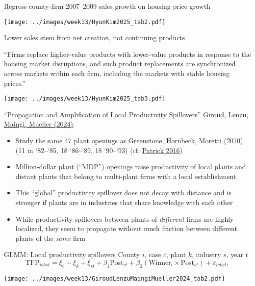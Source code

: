 \documentclass[11pt,notes=hide,aspectratio=169]{beamer}
\begin{document}
\begin{frame}{Regress county-firm 2007--2009 sales growth on housing price growth}
\begin{center}
\texttt{[image: ../images/week13/HyunKim2025\_tab2.pdf]}
\end{center}
\end{frame}
\begin{frame}{Lower sales stem from net creation, not continuing products}
{\scriptsize ``Firms replace higher-value products with lower-value products in response to the housing market disruptions, and such product replacements are synchronized across markets within each firm, including the markets with stable housing prices.''\par}
\begin{center}
\vspace{-2mm}
\texttt{[image: ../images/week13/HyunKim2025\_tab3.pdf]}
\end{center}
\end{frame}
\begin{frame}{``Propagation and Amplification of Local Productivity Spillovers''}
\href{https://doi.org/10.3982/ECTA20029}{Giroud, Lenzu, Maingi, Mueller (2024)}:
\begin{itemize}
\item Study the same 47 plant openings as \href{https://www.journals.uchicago.edu/doi/abs/10.1086/653714}{Greenstone, Hornbeck, Moretti (2010)}
(11 in `82--`85, 18 `86--`89, 18 `90--`93)
(cf. \href{https://onlinelibrary.wiley.com/doi/abs/10.1111/ecin.12339}{Patrick 2016})
\item Million-dollar plant (``MDP'') openings raise productivity of local plants and distant plants that belong to multi-plant firms with a local establishment
\item This ``global'' productivity spillover does not decay with distance and is stronger if plants are in industries that share knowledge with each other
\item While productivity spillovers between plants of \textit{different} firms are highly localized, they seem to propagate without much friction between different plants of the \textit{same} firm
\end{itemize}
\end{frame}
\begin{frame}{GLMM: Local productivity spillovers}
County $i$, case $c$, plant $k$, industry $s$, year $t$
\begin{equation*}
\text{TFP}_{ickst} = \xi_c + \xi_k + \xi_{st} + \beta_1 \text{Post}_{ct} + \beta_2 (\text{Winner}_i \times \text{Post}_{ct}) + \varepsilon_{ickst},
\end{equation*}
\begin{center}
\texttt{[image: ../images/week13/GiroudLenzuMaingiMueller2024\_tab2.pdf]}
\end{center}
\end{frame}
\end{document}
